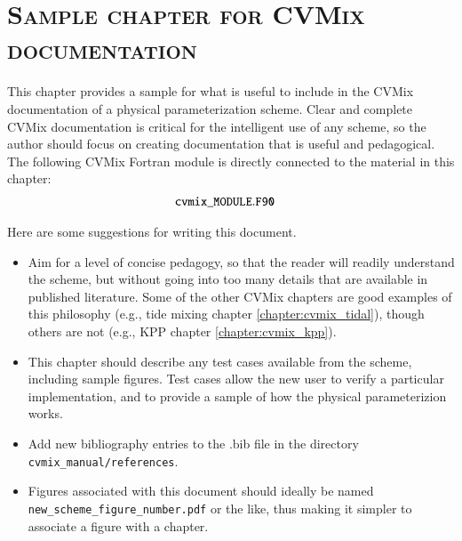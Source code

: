 \chapter{\scshape Sample chapter for CVMix documentation}
\label{chapter:cvmix_MODULE}

\minitoc
\vspace{.5cm}

\begin{mdframed}[backgroundcolor=lightgray!50]
  This chapter provides a sample for what is useful to include in the
  CVMix documentation of a physical parameterization scheme.  Clear
  and complete CVMix documentation is critical for the intelligent use
  of any scheme, so the author should focus on creating documentation
  that is useful and pedagogical.  The following CVMix Fortran module
  is directly connected to the material in this chapter:
\begin{align*} 
 &{\tt cvmix\_MODULE.F90}
\end{align*}
\end{mdframed}

Here are some suggestions for writing this document.
\begin{itemize}

\item Aim for a level of concise pedagogy, so that the reader will
  readily understand the scheme, but without going into too many
  details that are available in published literature.  Some of the
  other CVMix chapters are good examples of this philosophy (e.g.,
  tide mixing chapter \ref{chapter:cvmix_tidal}), though others are
  not (e.g., KPP chapter \ref{chapter:cvmix_kpp}).

\item This chapter should describe any test cases available from the
  scheme, including sample figures.  Test cases allow the new user to
  verify a particular implementation, and to provide a sample of how
  the physical parameterizion works.

\item Add new bibliography entries to the .bib file in the directory
  {\tt cvmix\_manual/references}.

\item Figures associated with this document should ideally be named
  {\tt new\_scheme\_figure\_number.pdf} or the like, thus making it
  simpler to associate a figure with a chapter.

\end{itemize}



